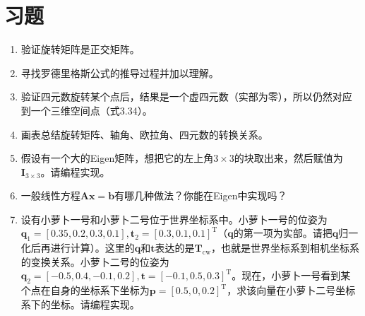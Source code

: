 \section*{习题}
\begin{enumerate}
	\item 验证旋转矩阵是正交矩阵。
	\item[\optional] 寻找罗德里格斯公式的推导过程并加以理解。
	\item 验证四元数旋转某个点后，结果是一个虚四元数（实部为零），所以仍然对应到一个三维空间点（式3.34）。
	\item 画表总结旋转矩阵、轴角、欧拉角、四元数的转换关系。
	\item 假设有一个大的Eigen矩阵，想把它的左上角$3 \times 3$的块取出来，然后赋值为$\bm{I}_{3 \times 3}$。请编程实现。
	\item[\optional] 一般线性方程$\bm{A} \bm{x}=\bm{b}$有哪几种做法？你能在Eigen中实现吗？
	\item 设有小萝卜一号和小萝卜二号位于世界坐标系中。小萝卜一号的位姿为$\bm{q}_1 = [ 0.35, 0.2, 0.3, 0.1 ], \bm{t}_2 = [0.3, 0.1, 0.1]^\mathrm{T}$（$\bm{q}$的第一项为实部。请把$\bm{q}$归一化后再进行计算）。这里的$\bm{q}$和$\bm{t}$表达的是$\bm{T}_{\mathrm{cw}}$，也就是世界坐标系到相机坐标系的变换关系。小萝卜二号的位姿为$\bm{q}_2 = [ -0.5, 0.4, -0.1, 0.2 ], \bm{t} = [-0.1, 0.5, 0.3]^\mathrm{T}$。现在，小萝卜一号看到某个点在自身的坐标系下坐标为$\bm{p} = [0.5,0,0.2]^\mathrm{T}$，求该向量在小萝卜二号坐标系下的坐标。请编程实现。
\end{enumerate}